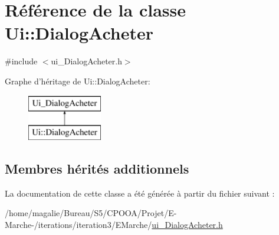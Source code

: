 \hypertarget{class_ui_1_1_dialog_acheter}{\section{Référence de la classe Ui\-:\-:Dialog\-Acheter}
\label{class_ui_1_1_dialog_acheter}
}


{\ttfamily \#include $<$ui\-\_\-\-Dialog\-Acheter.\-h$>$}

Graphe d'héritage de Ui\-:\-:Dialog\-Acheter\-:\begin{figure}[H]
\begin{center}
\leavevmode
\includegraphics[height=2.000000cm]{class_ui_1_1_dialog_acheter}
\end{center}
\end{figure}
\subsection*{Membres hérités additionnels}


La documentation de cette classe a été générée à partir du fichier suivant \-:\begin{DoxyCompactItemize}
\item 
/home/magalie/\-Bureau/\-S5/\-C\-P\-O\-O\-A/\-Projet/\-E-\/\-Marche-\//iterations/iteration3/\-E\-Marche/\hyperlink{ui___dialog_acheter_8h}{ui\-\_\-\-Dialog\-Acheter.\-h}\end{DoxyCompactItemize}
